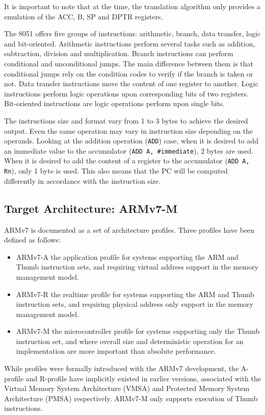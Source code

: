 \documentclass{report}
\begin{document}
		\par It is important to note that at the time, the translation algorithm only provides a emulation of the ACC, B, SP and DPTR registers.
		\par The 8051 offers five groups of instructions: arithmetic, branch, data transfer, logic and bit-oriented. Arithmetic instructions perform several tasks such as addition, subtraction, division and multiplication. Branch instructions can perform conditional and unconditional jumps. The main difference between them is that conditional jumps rely on the condition codes to verify if the branch is taken or not. Data transfer instructions move the content of one register to another. Logic instructions perform logic operations upon corresponding bits of two registers. Bit-oriented instructions are logic operations perform upon single bits\cite{mikroelektronika}.
		\par The instructions size and format vary from 1 to 3 bytes to achieve the desired output. Even the same operation may vary in instruction size depending on the operands. Looking at the addition operation (\texttt{ADD}) case, when it is desired to add an immediate value to the accumulator (\texttt{ADD A, \#immediate}), 2 bytes are used. When it is desired to add the content of a register to the accumulator (\texttt{ADD A, Rn}), only 1 byte is used. This also means that the PC will be computed differently in accordance with the instruction size.
		
		\subsection{Target Architecture: ARMv7-M \cite{armv7-m}}
		
		\par ARMv7 is documented as a set of architecture profiles. Three profiles have been defined as follows:
		\begin{itemize}
			\item ARMv7-A the application profile for systems supporting the ARM and Thumb instruction sets, and
			requiring virtual address support in the memory management model.
			\item ARMv7-R the realtime profile for systems supporting the ARM and Thumb instruction sets, and requiring physical address only support in the memory management model.
			\item ARMv7-M the microcontroller profile for systems supporting only the Thumb instruction set, and where overall size and deterministic operation for an implementation are more important than absolute performance.
		\end{itemize}
		\par While profiles were formally introduced with the ARMv7 development, the A-profile and R-profile have implicitly existed in earlier versions, associated with the Virtual Memory System Architecture (VMSA) and Protected Memory System Architecture (PMSA) respectively. ARMv7-M only supports execution of Thumb instructions.
		
\end{document}
